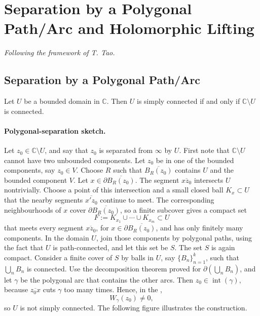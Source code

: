 \documentclass[11pt,a4paper]{article}
\begin{document}
\section*{Separation by a Polygonal Path/Arc and Holomorphic Lifting}
\textit{Following the framework of T. Tao.}

\subsection*{Separation by a Polygonal Path/Arc}

Let $U$ be a bounded domain in $\mathbb C$. Then $U$ is simply connected if and only if $\mathbb C\setminus U$ is connected.

\paragraph{Polygonal-separation sketch.}
Let $z_0\in\mathbb C\setminus U$, and say that $z_0$ is separated from $\infty$ by $U$. First note that $\mathbb C\setminus U$ cannot have two unbounded components. Let $z_0$ be in one of the bounded components, say $z_0\in V$. Choose $R$ such that $\overline{B_R(z_0)}$ contains $U$ and the bounded component $V$. Let $x\in\partial\overline{B_R(z_0)}$. The segment $\overline{xz_0}$ intersects $U$ nontrivially. Choose a point of this intersection and a small closed ball $K_x\subset U$ that the nearby segments $\overline{x'z_0}$ continue to meet. The corresponding neighbourhoods of $x$ cover $\partial\overline{B_R(z_0)}$, so a finite subcover gives a compact set
\[
  F:=K_{x_1}\cup\cdots\cup K_{x_m}\subset U
\]
that meets every segment $\overline{xz_0}$, for $x\in\partial\overline{B_R(z_0)}$, and has only finitely many components. In the domain $U$, join those components by polygonal paths, using the fact that $U$ is path-connected, and let this set be $S$. The set $S$ is again compact. Consider a finite cover of $S$ by balls in $U$, say $\{B_n\}_{n=1}^k$, such that $\bigcup_nB_n$ is connected. Use the decomposition theorem proved for $\partial(\bigcup_nB_n)$, and let $\gamma$ be the polygonal arc that contains the other arcs. Then \(z_0\in\operatorname{int}(\gamma),\)
because $\overline{z_0x}$ cuts $\gamma$ too many times. Hence, in the ,
\[
  W_\gamma(z_0)\ne0,
\]
so $U$ is not simply connected. The following figure illustrates the construction.
\end{document}

